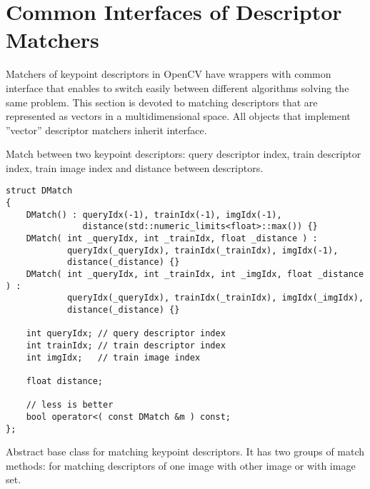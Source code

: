 \section{Common Interfaces of Descriptor Matchers}
Matchers of keypoint descriptors in OpenCV have wrappers with common interface that enables to switch easily 
between different algorithms solving the same problem. This section is devoted to matching descriptors 
that are represented as vectors in a multidimensional space. All objects that implement ''vector'' 
descriptor matchers inherit  interface.

\label{cv.class.DMatch}
Match between two keypoint descriptors: query descriptor index, 
train descriptor index, train image index and distance between descriptors.

\begin{lstlisting}
struct DMatch
{
    DMatch() : queryIdx(-1), trainIdx(-1), imgIdx(-1), 
               distance(std::numeric_limits<float>::max()) {}
    DMatch( int _queryIdx, int _trainIdx, float _distance ) :
            queryIdx(_queryIdx), trainIdx(_trainIdx), imgIdx(-1), 
            distance(_distance) {}
    DMatch( int _queryIdx, int _trainIdx, int _imgIdx, float _distance ) :
            queryIdx(_queryIdx), trainIdx(_trainIdx), imgIdx(_imgIdx), 
            distance(_distance) {}

    int queryIdx; // query descriptor index
    int trainIdx; // train descriptor index
    int imgIdx;   // train image index

    float distance;

    // less is better
    bool operator<( const DMatch &m ) const;
};
\end{lstlisting}

\label{cv.class.DescriptorMatcher}
Abstract base class for matching keypoint descriptors. It has two groups 
of match methods: for matching descriptors of one image with other image or
with image set.

